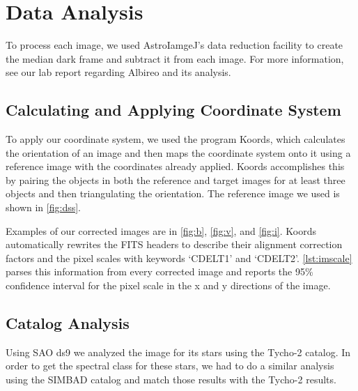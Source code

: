\documentclass[%
aip,
jmp,
reprint,
floatfix,
nofootinbib
]{revtex4-1}
\begin{document}
	\section{Data Analysis}
	
	To process each image, we used AstroIamgeJ's data reduction facility to create the median dark frame and subtract it from each image. For more information, see our lab report regarding Albireo and its analysis. 
	
	\subsection{Calculating and Applying Coordinate System}
	To apply our coordinate system, we used the program Koords, which calculates the orientation of an image and then maps the coordinate system onto it using a reference image with the coordinates already applied. Koords accomplishes this by pairing the objects in both the reference and target images for at least three objects and then triangulating the orientation. The reference image we used is shown in \autoref{fig:dss}.
	
	Examples of our corrected images are in \autoref{fig:b}, \autoref{fig:v}, and \autoref{fig:i}. Koords automatically rewrites the FITS headers to describe their alignment correction factors and the pixel scales with keywords `CDELT1' and `CDELT2'. \autoref{lst:imscale} parses this information from every corrected image and reports the 95\% confidence interval for the pixel scale in the x and y directions of the image. 
	
	\subsection{Catalog Analysis}
	Using SAO ds9 we analyzed the image for its stars using the Tycho-2 catalog. In order to get the spectral class for these stars, we had to do a similar analysis using the SIMBAD catalog and match those results with the Tycho-2 results.
	
\end{document}
